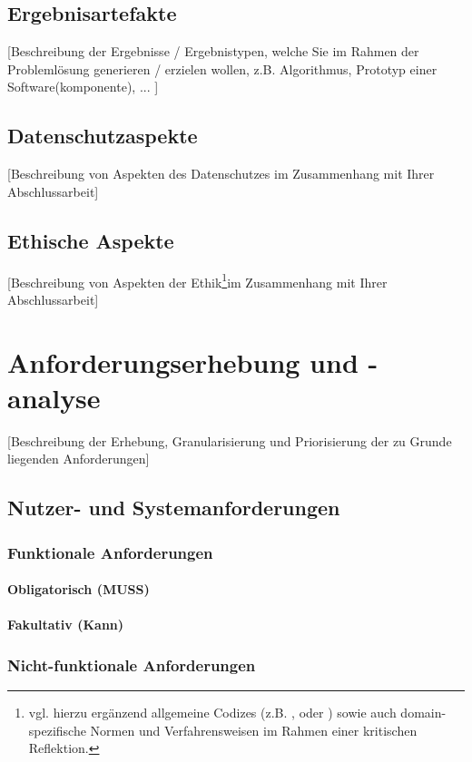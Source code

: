 \documentclass[oneside,bibliography=totocnumbered,BCOR=5mm]{scrbook}%
\theoremstyle{definition}
\theoremstyle{definition}
\theoremstyle{definition}
\theoremstyle{definition}
\theoremstyle{definition}
\theoremstyle{definition}
\begin{document}
\section{Ergebnisartefakte}
[Beschreibung der Ergebnisse / Ergebnistypen, welche Sie im Rahmen der Probleml\"osung generieren / erzielen wollen, z.B. Algorithmus, Prototyp einer Software(komponente), ... ]

\section{Datenschutzaspekte}
[Beschreibung von Aspekten des Datenschutzes im Zusammenhang mit Ihrer Abschlussarbeit]

\section{Ethische Aspekte}
[Beschreibung von Aspekten der Ethik\footnote{vgl. hierzu erg\"anzend allgemeine Codizes (z.B. \autocite{acm}, \autocite{ieee} oder \autocite{gi}) sowie auch domain-spezifische Normen und Verfahrensweisen im Rahmen einer kritischen Reflektion.}im Zusammenhang mit Ihrer Abschlussarbeit]



\chapter{Anforderungserhebung und -analyse}
[Beschreibung der Erhebung, Granularisierung und Priorisierung der zu Grunde liegenden Anforderungen]
\section{Nutzer- und Systemanforderungen}
\subsection{Funktionale Anforderungen}
\subsubsection{Obligatorisch (MUSS)}
\subsubsection{Fakultativ (Kann)}
\subsection{Nicht-funktionale Anforderungen}
\end{document}
